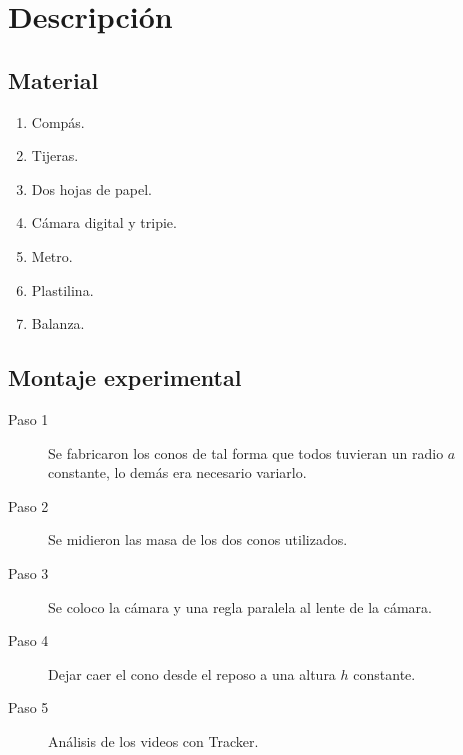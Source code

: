 \section{Descripción}

\subsection{Material}

\begin{enumerate}
    \item Compás.
    \item Tijeras.
    \item Dos hojas de papel.
    \item Cámara digital y tripie.
    \item Metro.
    \item Plastilina.
    \item Balanza.
\end{enumerate}

\subsection{Montaje experimental}

\begin{description}
    \item[Paso 1] Se fabricaron los conos de tal forma que todos
        tuvieran un radio $a$ constante, lo demás era necesario variarlo.
    \item[Paso 2] Se midieron las masa de los dos conos utilizados.
    \item[Paso 3] Se coloco la cámara y una regla paralela al lente de
        la cámara.
    \item[Paso 4] Dejar caer el cono desde el reposo a una altura $h$ constante.
    \item[Paso 5] Análisis de los videos con Tracker.
\end{description}
